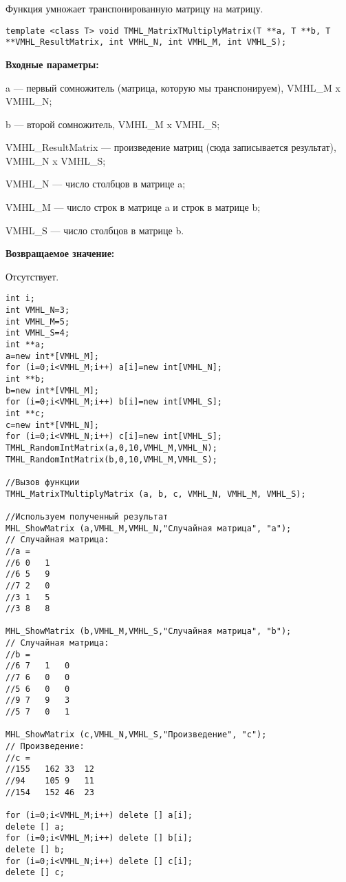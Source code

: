 \documentclass[a4paper,12pt]{article}
\begin{document}
Функция умножает транспонированную матрицу на матрицу.


\begin{lstlisting}[label=code_syntax_TMHL_MatrixTMultiplyMatrix,caption=Синтаксис]
template <class T> void TMHL_MatrixTMultiplyMatrix(T **a, T **b, T **VMHL_ResultMatrix, int VMHL_N, int VMHL_M, int VMHL_S);
\end{lstlisting}

\textbf{Входные параметры:}
 
a --- первый сомножитель (матрица, которую мы транспонируем), VMHL\_M x VMHL\_N;
 
b --- второй сомножитель, VMHL\_M x VMHL\_S;
 
VMHL\_ResultMatrix --- произведение матриц (сюда записывается результат), VMHL\_N x VMHL\_S;
 
VMHL\_N --- число столбцов в матрице a;
 
VMHL\_M --- число строк в матрице a и строк в матрице b;
 
VMHL\_S --- число столбцов в матрице b.

\textbf{Возвращаемое значение:}

Отсутствует.


\begin{lstlisting}[label=code_use_TMHL_MatrixTMultiplyMatrix,caption=Пример использования]
int i;
int VMHL_N=3;
int VMHL_M=5;
int VMHL_S=4;
int **a;
a=new int*[VMHL_M];
for (i=0;i<VMHL_M;i++) a[i]=new int[VMHL_N];
int **b;
b=new int*[VMHL_M];
for (i=0;i<VMHL_M;i++) b[i]=new int[VMHL_S];
int **c;
c=new int*[VMHL_N];
for (i=0;i<VMHL_N;i++) c[i]=new int[VMHL_S];
TMHL_RandomIntMatrix(a,0,10,VMHL_M,VMHL_N);
TMHL_RandomIntMatrix(b,0,10,VMHL_M,VMHL_S);

//Вызов функции
TMHL_MatrixTMultiplyMatrix (a, b, c, VMHL_N, VMHL_M, VMHL_S);

//Используем полученный результат
MHL_ShowMatrix (a,VMHL_M,VMHL_N,"Случайная матрица", "a");
// Случайная матрица:
//a =
//6	0	1
//6	5	9
//7	2	0
//3	1	5
//3	8	8

MHL_ShowMatrix (b,VMHL_M,VMHL_S,"Случайная матрица", "b");
// Случайная матрица:
//b =
//6	7	1	0
//7	6	0	0
//5	6	0	0
//9	7	9	3
//5	7	0	1

MHL_ShowMatrix (c,VMHL_N,VMHL_S,"Произведение", "c");
// Произведение:
//c =
//155	162	33	12
//94	105	9	11
//154	152	46	23

for (i=0;i<VMHL_M;i++) delete [] a[i];
delete [] a;
for (i=0;i<VMHL_M;i++) delete [] b[i];
delete [] b;
for (i=0;i<VMHL_N;i++) delete [] c[i];
delete [] c;
\end{lstlisting}
\end{document}
